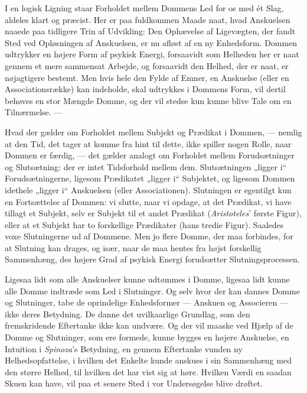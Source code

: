 \documentclass[12pt,a4paper]{book}
\newcommand{\apage}[1]{\marginnote{\footnotesize\textit{[#1]}}}
\begin{document}
I en logisk Ligning staar Forholdet mellem Dommens \apage{95} Led for os med ét
Slag, aldeles klart og præcist. Her er paa fuldkommen Maade naat, hvad
Anskuelsen naaede paa tidligere Trin af Udvikling: Den Ophævelse af
Ligevægten, der fandt Sted ved Opløsningen af Anskuelsen, er nu afløst
af en ny Enhedsform. Dommen udtrykker en højere Form af psykisk Energi,
forsaavidt som Helheden her er naat gennem et mere sammensat Arbejde, og
forsaavidt den Helhed, der er naat, er nøjagtigere bestemt. Men hvis
hele den Fylde af Emner, en Anskuelse (eller en Associationsrække) kan
indeholde, skal udtrykkes i Dommens Form, vil dertil behøves en stor
Mængde Domme, og der vil stedse kun kunne blive Tale om en Tilnærmelse.
---

Hvad der gælder om Forholdet mellem Subjekt og Prædikat i Dommen, ---
nemlig at den Tid, det tager at komme fra hint til dette, ikke spiller
nogen Rolle, naar Dommen er færdig, --- det gælder analogt om Forholdet
mellem Forudsætninger og Slutsætning: der er intet Tidsforhold mellem
dem. Slutsætningen „ligger i“ Forudsætningerne, ligesom Prædikatet
„ligger i“ Subjektet, og ligesom Dommen idethele „ligger i“ Anskuelsen
(eller Associationen). Slutningen er egentilgt kun en Fortsættelse af
Dommen: vi slutte, naar vi opdage, at det Prædikat, vi have tillagt et
Subjekt, selv er Subjekt til et andet Prædikat (\emph{Aristoteles}'
første Figur), eller at et Subjekt har to forskellige Prædikater (hans
tredie Figur). Saaledes voxe Slutningerne ud af Dommene. Men jo flere
Domme, der maa forbindes, for at Slutning kan drages, og især, naar de
maa hentes fra højst forskellig Sammenhæng, des højere Grad af psykisk
Energi forudsætter Slutningsprocessen.

Ligesaa lidt som alle Anskuelser kunne udtømmes i Domme, ligesaa lidt
kunne alle Domme indtræde som Led i Slutninger. Og selv hvor der kan
dannes Domme og Slutninger, tabe de oprindelige Enhedsformer --- Anskuen
og Associeren --- ikke deres Betydning. De danne det uvilkaarlige
Grundlag, som den fremskridende Eftertanke ikke kan undvære. Og der vil
maaske ved Hjælp af de Domme og Slutninger, som ere formede, kunne
bygges en højere Anskuelse, en \apage{96} Intuition i \emph{Spinoza}'s Betydning, en
gennem Eftertanke vunden ny Helhedsopfattelse, i hvilken det Enkelte
kunde anskues i sin Sammenhæng med den større Helhed, til hvilken det
har vist sig at høre. Hvilken Værdi en saadan Skuen kan have, vil paa et
senere Sted i vor Undersøgelse blive drøftet.
\end{document}
